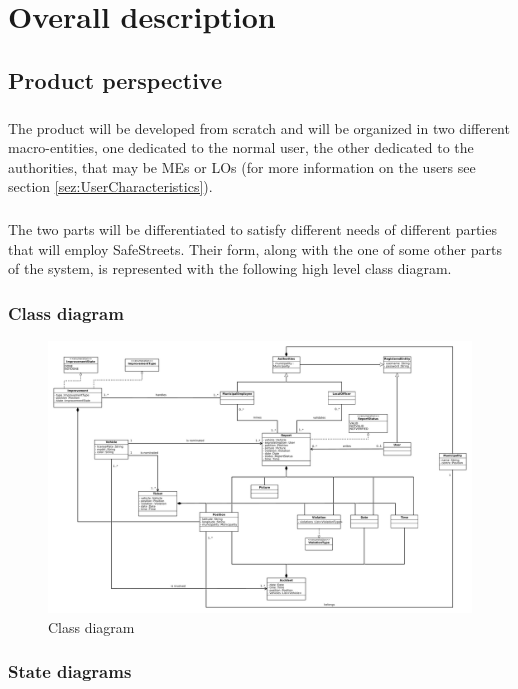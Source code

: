 \chapter{Overall description}
		\section{Product perspective}
			\paragraph{}
				The product will be developed from scratch and will be organized in two different macro-entities, one dedicated to the normal user, the other dedicated to the authorities, that may be MEs or LOs (for more information on the users see section \ref{sez:UserCharacteristics}). 
			\paragraph{}
				The two parts will be differentiated to satisfy different needs of different parties that will employ
SafeStreets. Their form, along with the one of some other parts of the system, is represented with the following
high level class diagram.
			\subsection{Class diagram}
				\begin{figure}[htbp]
  					\includegraphics[width=\textwidth]{images/ClassDiagram/SafeStreetsUML.pdf}
  					\caption{Class diagram}
				\end{figure}
			\subsection{State diagrams}
